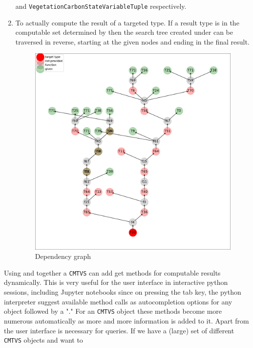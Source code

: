 \begin{enumerate}
{  } and 
  \texttt{VegetationCarbonStateVariableTuple} 
  respectively. 
  \item
  \label{enum:compute}
  To actually  compute the result of a targeted type.
  If a result type is in the computable set determined by  then 
  the search tree created under  can be traversed in reverse, starting
  at the given nodes and ending in the final result.
\begin{figure}[h]
  \includegraphics[width=\textwidth]{dep_graph.pdf}
  \caption{ Dependency graph}
  {
    \small
    
  }  
  \label{fig:dep_graph}
\end{figure}  
\end{enumerate} 
Using  and  together a
\texttt{CMTVS} can add get methods for computable results dynamically.  This
is very useful for the user interface in interactive python sessions,
including Jupyter notebooks since on pressing the tab key, the python
interpreter suggest available method calls as autocompletion options for any
object followed by a "." For an \texttt{CMTVS} object these methods become
more numerous automatically as more and more information is added to it.
Apart from the user interface  is necessary for queries.
If we have a (large) set of different \texttt{CMTVS} objects and want to
